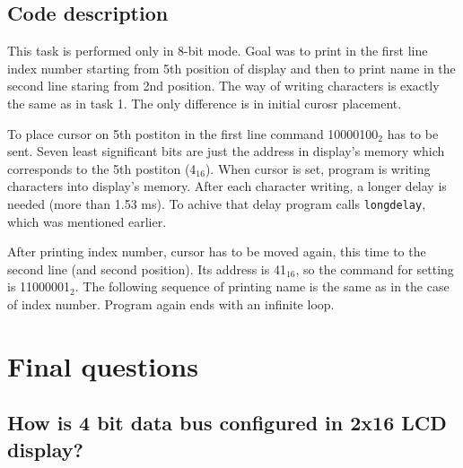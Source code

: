 \documentclass{article}
\begin{document}
\subsection{Code description}
This task is performed only in 8-bit mode. Goal was to print in the first line index number
starting from 5th position of display and then to print name in the second line staring from 2nd
position. The way of writing characters is exactly the same as in task 1. The only difference is
in initial curosr placement.

To place cursor on 5th postiton in the first line command 10000100$_2$ has to be sent.
Seven least significant bits are just the address in display's memory which corresponds
to the 5th postiton (4$_{16}$). When cursor is set, program is writing characters into display's
memory. After each character writing, a longer delay is needed (more than 1.53 ms). To achive
that delay program calls \texttt{long\textunderscore delay}, which was mentioned earlier.

After printing index number, cursor has to be moved again, this time to the second line (and second position).
Its address is 41$_{16}$, so the command for setting is 11000001$_2$. The following sequence
of printing name is the same as in the case of index number. Program again ends with an infinite loop.

\section{Final questions}
\subsection{How is 4 bit data bus configured in 2x16 LCD display?}
\end{document}
